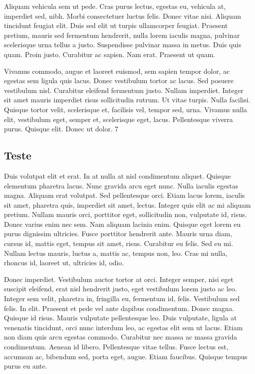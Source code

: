 Aliquam vehicula sem ut pede. Cras purus lectus, egestas eu, vehicula at, imperdiet sed, nibh. Morbi consectetuer luctus felis. Donec vitae nisi. Aliquam tincidunt feugiat elit. Duis sed elit ut turpis ullamcorper feugiat. Praesent pretium, mauris sed fermentum hendrerit, nulla lorem iaculis magna, pulvinar scelerisque urna tellus a justo. Suspendisse pulvinar massa in metus. Duis quis quam. Proin justo. Curabitur ac sapien. Nam erat. Praesent ut quam.

Vivamus commodo, augue et laoreet euismod, sem sapien tempor dolor, ac egestas sem ligula quis lacus. Donec vestibulum tortor ac lacus. Sed posuere vestibulum nisl. Curabitur eleifend fermentum justo. Nullam imperdiet. Integer sit amet mauris imperdiet risus sollicitudin rutrum. Ut vitae turpis. Nulla facilisi. Quisque tortor velit, scelerisque et, facilisis vel, tempor sed, urna. Vivamus nulla elit, vestibulum eget, semper et, scelerisque eget, lacus. Pellentesque viverra purus. Quisque elit. Donec ut dolor.
7
\subsection{Teste}
Duis volutpat elit et erat. In at nulla at nisl condimentum aliquet. Quisque elementum pharetra lacus. Nunc gravida arcu eget nunc. Nulla iaculis egestas magna. Aliquam erat volutpat. Sed pellentesque orci. Etiam lacus lorem, iaculis sit amet, pharetra quis, imperdiet sit amet, lectus. Integer quis elit ac mi aliquam pretium. Nullam mauris orci, porttitor eget, sollicitudin non, vulputate id, risus. Donec varius enim nec sem. Nam aliquam lacinia enim. Quisque eget lorem eu purus dignissim ultricies. Fusce porttitor hendrerit ante. Mauris urna diam, cursus id, mattis eget, tempus sit amet, risus. Curabitur eu felis. Sed eu mi. Nullam lectus mauris, luctus a, mattis ac, tempus non, leo. Cras mi nulla, rhoncus id, laoreet ut, ultricies id, odio.

Donec imperdiet. Vestibulum auctor tortor at orci. Integer semper, nisi eget suscipit eleifend, erat nisl hendrerit justo, eget vestibulum lorem justo ac leo. Integer sem velit, pharetra in, fringilla eu, fermentum id, felis. Vestibulum sed felis. In elit. Praesent et pede vel ante dapibus condimentum. Donec magna. Quisque id risus. Mauris vulputate pellentesque leo. Duis vulputate, ligula at venenatis tincidunt, orci nunc interdum leo, ac egestas elit sem ut lacus. Etiam non diam quis arcu egestas commodo. Curabitur nec massa ac massa gravida condimentum. Aenean id libero. Pellentesque vitae tellus. Fusce lectus est, accumsan ac, bibendum sed, porta eget, augue. Etiam faucibus. Quisque tempus purus eu ante.
